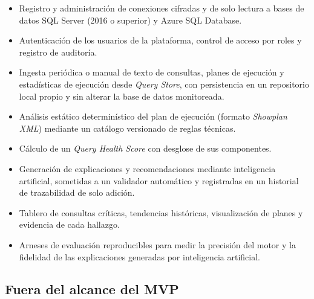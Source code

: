 \documentclass[11pt,a4paper]{report}
\begin{document}
\begin{itemize}
\item Registro y administraci\'on de conexiones cifradas y de solo lectura a bases de datos SQL Server (2016 o superior) y Azure SQL Database.
\item Autenticaci\'on de los usuarios de la plataforma, control de acceso por roles y registro de auditor\'ia.
\item Ingesta peri\'odica o manual de texto de consultas, planes de ejecuci\'on y estad\'isticas de ejecuci\'on desde \textit{Query Store}, con persistencia en un repositorio local propio y sin alterar la base de datos monitoreada.
\item An\'alisis est\'atico determin\'istico del plan de ejecuci\'on (formato \textit{Showplan XML}) mediante un cat\'alogo versionado de reglas t\'ecnicas.
\item C\'alculo de un \textit{Query Health Score} con desglose de sus componentes.
\item Generaci\'on de explicaciones y recomendaciones mediante inteligencia artificial, sometidas a un validador autom\'atico y registradas en un historial de trazabilidad de solo adici\'on.
\item Tablero de consultas cr\'iticas, tendencias hist\'oricas, visualizaci\'on de planes y evidencia de cada hallazgo.
\item Arneses de evaluaci\'on reproducibles para medir la precisi\'on del motor y la fidelidad de las explicaciones generadas por inteligencia artificial.
\end{itemize}

\subsection{Fuera del alcance del MVP}
\end{document}
